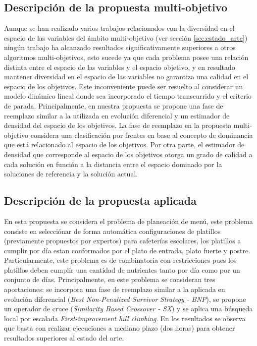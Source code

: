 \subsection{Descripción de la propuesta multi-objetivo}

Aunque se han realizado varios trabajos relacionados con la diversidad en el espacio de las variables del ámbito multi-objetivo (ver sección \ref{sec:estado_arte}) ningún trabajo ha alcanzado resultados significativamente superiores a otros algoritmos multi-objetivos, esto sucede ya que cada problema posee una relación distinta entre el espacio de las variables y el espacio objetivo, y en resultado mantener diversidad en el espacio de las variables no garantiza una calidad en el espacio de los objetivos.
%
Este inconveniente puede ser resuelto al considerar un modelo dinámico lineal donde sea incorporado el tiempo transcurrido y el criterio de parada.
%
Principalmente, en nuestra propuesta se propone una fase de reemplazo similar a la utilizada en evolución diferencial y un estimador de densidad del espacio de los objetivos.
%
La fase de reemplazo en la propuesta multi-objetivo considera una clasificación por frentes en base al concepto de dominancia que está relacionado al espacio de los objetivos.
%
Por otra parte, el estimador de densidad que corresponde al espacio de los objetivos otorga un grado de calidad a cada solución en función a la distancia entre el espacio dominado por la soluciones de referencia y la solución actual.
%

\subsection{Descripción de la propuesta aplicada}

En esta propuesta se considera el problema de planeación de menú, este problema consiste en selecciónar de forma automática configuraciones de platillos (previamente propuestos por expertos) para cafeterías escolares, los platillos a cumplir por día estan conformados por el plato de entrada, plato fuerte y postre. 
%
Particularmente, este problema es de combinatoria con restricciones pues los platillos deben cumplir una cantidad de nutrientes tanto por día como por un conjunto de días.
%
Principalmente, en este problema se consideran tres aportaciones: se incorpora una fase de reemplazo similar a la aplicada en evolución diferencial (\textit{Best Non-Penalized Survivor Strategy - BNP}), se propone un operador de cruce (\textit{Similarity Based Crossover - SX}) y se aplica una búsqueda local por escalada \textit{First-improvement hill climbing}.
%
En los resultados se observa que basta con realizar ejecuciones a mediano plazo (dos horas) para obtener resultados superiores al estado del arte.

